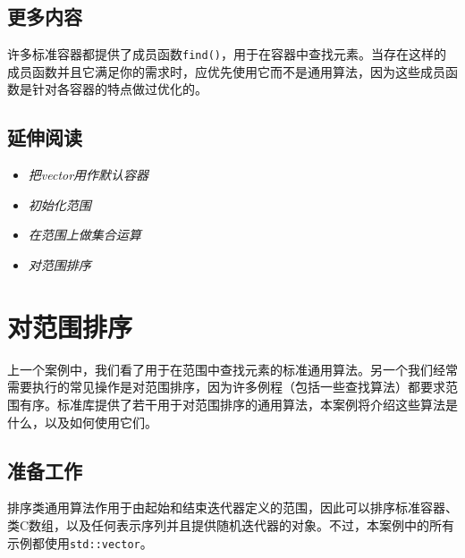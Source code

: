 
\subsection{更多内容}



许多标准容器都提供了成员函数\texttt{find()}，用于在容器中查找元素。当存在这样的成员函数并且它满足你的需求时，应优先使用它而不是通用算法，因为这些成员函数是针对各容器的特点做过优化的。



\subsection{延伸阅读}



\begin{itemize}
\item \textit{把vector用作默认容器}



\item \textit{初始化范围}



\item \textit{在范围上做集合运算}



\item \textit{对范围排序}

\end{itemize}



\section{对范围排序}



上一个案例中，我们看了用于在范围中查找元素的标准通用算法。另一个我们经常需要执行的常见操作是对范围排序，因为许多例程（包括一些查找算法）都要求范围有序。标准库提供了若干用于对范围排序的通用算法，本案例将介绍这些算法是什么，以及如何使用它们。



\subsection{准备工作}



排序类通用算法作用于由起始和结束迭代器定义的范围，因此可以排序标准容器、类C数组，以及任何表示序列并且提供随机迭代器的对象。不过，本案例中的所有示例都使用\texttt{std::\allowbreak{}vector}。


